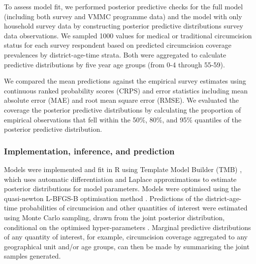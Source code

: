 \documentclass{article}
\begin{document}

To assess model fit, we performed  posterior predictive checks for the full model (including both survey and VMMC programme data) and the model with only household survey data by constructing posterior predictive distributions survey data observations. We sampled 1000 values for medical or traditional circumcision status for each survey respondent based on predicted circumcision coverage prevalences by district-age-time strata. Both were aggregated to calculate predictive distributions by five year age groups (from 0-4 through 55-59).  

We compared the mean predictions against the empirical survey estimates using continuous ranked probability scores (CRPS) and error statistics including mean absolute error (MAE) and root mean square error (RMSE). We evaluated the coverage the posterior predictive distributions by calculating the proportion of empirical observations that fell within the 50\%, 80\%, and 95\% quantiles of the posterior predictive distribution. 


\subsubsection*{Implementation, inference, and prediction}


Models were implemented and fit in R \autocite{rcore} using Template Model Builder (TMB) \autocite{kristensen2016tmb}, which uses automatic differentiation and Laplace approximations to estimate posterior distributions for model parameters. Models were optimised using the quasi-newton L-BFGS-B optimisation method \autocite{byrd1995limited}. Predictions of the district-age-time probabilities of circumcision and other quantities of interest were estimated using Monte Carlo sampling, drawn from the joint posterior distribution, conditional on the optimised hyper-parameters \autocite{eaton2021naomi}. Marginal predictive distributions of any quantity of interest, for example, circumcision coverage aggregated to any geographical unit and/or age groups, can then be made by summarising the joint samples generated.
\end{document}
